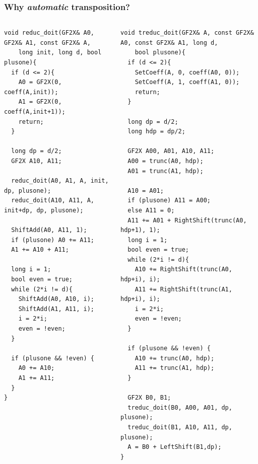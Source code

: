 \documentclass[10pt]{beamer}
\begin{document}
\begin{frame}[fragile]
  \tiny
  \frametitle{Why \emph{automatic} transposition?}

  \begin{columns}
    \begin{column}{0.5\textwidth}
      \begin{center}
        \begin{minipage}{\textwidth}
\begin{verbatim}
void reduc_doit(GF2X& A0, GF2X& A1, const GF2X& A,
	long init, long d, bool plusone){
  if (d <= 2){
    A0 = GF2X(0, coeff(A,init));
    A1 = GF2X(0, coeff(A,init+1));
    return;
  }
   
  long dp = d/2;
  GF2X A10, A11;

  reduc_doit(A0, A1, A, init, dp, plusone);
  reduc_doit(A10, A11, A, init+dp, dp, plusone);
 
  ShiftAdd(A0, A11, 1);
  if (plusone) A0 += A11;
  A1 += A10 + A11;

  long i = 1;
  bool even = true;
  while (2*i != d){
    ShiftAdd(A0, A10, i);
    ShiftAdd(A1, A11, i);
    i = 2*i;
    even = !even;
  }
  
  if (plusone && !even) {
    A0 += A10;
    A1 += A11;
  }
}
\end{verbatim}
        \end{minipage}
      \end{center}
    \end{column}

    \begin{column}{0.5\textwidth}
      \begin{center}
        \begin{minipage}{\textwidth}
\begin{verbatim}
void treduc_doit(GF2X& A, const GF2X& A0, const GF2X& A1, long d,
	bool plusone){
  if (d <= 2){
    SetCoeff(A, 0, coeff(A0, 0));
    SetCoeff(A, 1, coeff(A1, 0));
    return;
  }
   
  long dp = d/2;
  long hdp = dp/2;

  GF2X A00, A01, A10, A11;
  A00 = trunc(A0, hdp);
  A01 = trunc(A1, hdp);

  A10 = A01;
  if (plusone) A11 = A00;
  else A11 = 0;
  A11 += A01 + RightShift(trunc(A0, hdp+1), 1);
  long i = 1;
  bool even = true;
  while (2*i != d){
    A10 += RightShift(trunc(A0, hdp+i), i);
    A11 += RightShift(trunc(A1, hdp+i), i);
    i = 2*i;
    even = !even;
  }
  
  if (plusone && !even) {
    A10 += trunc(A0, hdp);
    A11 += trunc(A1, hdp);
  }
  
  GF2X B0, B1;
  treduc_doit(B0, A00, A01, dp, plusone);
  treduc_doit(B1, A10, A11, dp, plusone);
  A = B0 + LeftShift(B1,dp);
}
\end{verbatim}
        \end{minipage}
      \end{center}
    \end{column}
    \end{columns}
\end{frame}
\end{document}
